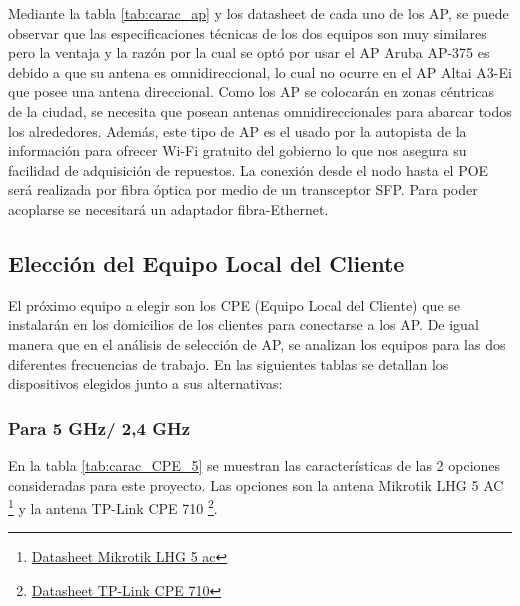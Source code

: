 \documentclass[11pt,a4paper]{article}
\begin{document}
Mediante la tabla \ref{tab:carac_ap}  y los datasheet de cada uno de los AP, se puede observar que las especificaciones técnicas de los dos equipos son muy similares pero la ventaja y la razón por la cual se optó por usar el AP Aruba AP-375 es debido a que su antena es omnidireccional, lo cual no ocurre en el AP Altai A3-Ei que posee una antena direccional. 
Como los AP se colocarán en zonas céntricas de la ciudad, se necesita que posean antenas omnidireccionales para abarcar todos los alrededores. 
Además, este tipo de AP es el usado por la autopista de la información para ofrecer  Wi-Fi gratuito del gobierno lo que nos asegura su facilidad de adquisición de repuestos. 
La conexión desde el nodo hasta el POE será realizada por fibra óptica por medio de un transceptor SFP. Para poder acoplarse se necesitará un adaptador fibra-Ethernet.

\subsection{Elección del Equipo Local del Cliente}

El próximo equipo a elegir son los CPE (Equipo Local del Cliente) que se instalarán en los domicilios de los clientes para conectarse a los AP. 
De igual manera que en el análisis de selección de AP, se analizan los equipos para las dos diferentes frecuencias de trabajo. 
En las siguientes tablas se detallan los dispositivos elegidos junto a sus alternativas:

\subsubsection{Para 5 GHz/ 2,4 GHz}

En la tabla \ref{tab:carac_CPE_5} se muestran las características de las 2 opciones consideradas para este proyecto.
Las opciones son la antena Mikrotik LHG 5 AC \footnote{\href{https://mikrotik.com/product/lhg_5_ac}{Datasheet Mikrotik LHG 5 ac}} y la antena TP-Link CPE 710 \footnote{\href{https://static.tp-link.com/2020/202003/20200324/CPE\%20series-Datasheet.pdf}{Datasheet TP-Link CPE 710}}.
\end{document}
